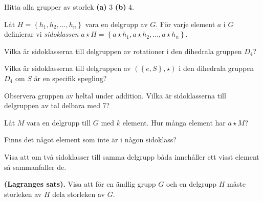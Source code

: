 \documentclass[11pt,fleqn]{book} %
\begin{document}
\begin{problem}
	Hitta alla grupper av storlek \textbf{(a)} \(3\) \textbf{(b)} \(4\).
\end{problem}

\begin{definition} Låt \(H = \left\{h_1, h_2, \dots, h_n\right\}\) vara en delgrupp av \(G\). För varje element \(a\) i \(G\) definierar vi \textit{sidoklassen} \(a \star H = \left\{a  \star h_1, a \star h_2, \dots, a \star h_n\right\}\).
\end{definition}

\begin{problem}
  Vilka är sidoklasserna till delgruppen av rotationer i den dihedrala gruppen \(D_4\)?
\end{problem}

\begin{problem}
  Vilka är sidoklasserna till delgruppen av \((\left\{e, S\right\},  \star )\) i den dihedrala gruppen \(D_4\) om \(S\) är en specifik spegling?
\end{problem}

\begin{problem}
  Observera gruppen av heltal under addition. Vilka är sidoklasserna till delgruppen av tal delbara med 7?
\end{problem}

\begin{problem}
  Låt \(M\) vara en delgrupp till \(G\) med \(k\) element. Hur många element har \(a  \star M\)?
\end{problem}

\begin{problem} 
	Finns det något element som inte är i någon sidoklass?
\end{problem}

\begin{problem}
	Visa att om två sidoklasser till samma delgrupp båda innehåller ett visst element så sammanfaller de.
\end{problem}

\begin{problem} \textbf{(Lagranges sats).} 
	Visa att för en ändlig grupp \(G\) och en delgrupp \(H\) måste storleken av \(H\) dela storleken av \(G\).
\end{problem}
\end{document}
